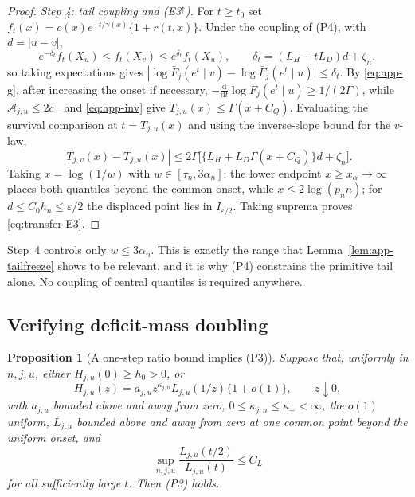 \documentclass[bj,authoryear]{imsart}
\theoremstyle{plain}
\newtheorem{proposition}[theorem]{Proposition}
\begin{document}
\begin{appendix}
\begin{proof}
\emph{Step 4: tail coupling and (E3$^\uparrow$).} For $t\ge t_0$ set
$f_t(x)=c(x)e^{-t/\gamma(x)}\{1+r(t,x)\}$. Under the coupling of (P4),
with $d=|u-v|$,
\[
 e^{-\delta_t}f_t(X_u)\le f_t(X_v)\le e^{\delta_t}f_t(X_u),
 \qquad
 \delta_t=(L_H+tL_D)d+\zeta_n,
\]
so taking expectations gives
$|\log\bar F_j(e^t\mid v)-\log\bar F_j(e^t\mid u)|\le\delta_t$. By
\eqref{eq:app-g}, after increasing the onset if necessary,
$-\frac{\mathrm d}{\mathrm dt}\log\bar F_j(e^t\mid u)\ge1/(2\Gamma)$,
while $\mathcal A_{j,u}\le2c_+$ and \eqref{eq:app-inv} give
$T_{j,u}(x)\le\Gamma(x+C_Q)$. Evaluating the survival comparison at
$t=T_{j,u}(x)$ and using the inverse-slope bound for the $v$-law,
\[
 |T_{j,v}(x)-T_{j,u}(x)|
 \le2\Gamma\bigl[\{L_H+L_D\Gamma(x+C_Q)\}d+\zeta_n\bigr].
\]
Taking $x=\log(1/w)$ with $w\in[\tau_n,3\alpha_n]$: the lower endpoint
$x\ge x_\alpha\to\infty$ places both quantiles beyond the common onset,
while $x\le2\log(p_nn)$; for $d\le C_0h_n\le\varepsilon/2$ the displaced
point lies in $I_{\varepsilon/2}$. Taking suprema proves
\eqref{eq:transfer-E3}.
\end{proof}

\begin{remark}
Step~4 controls only $w\le3\alpha_n$. This is exactly the range that
Lemma~\ref{lem:app-tailfreeze} shows to be relevant, and it is why (P4)
constrains the primitive tail alone. No coupling of central quantiles is
required anywhere.
\end{remark}

\subsection{Verifying deficit-mass doubling}

\begin{proposition}[A one-step ratio bound implies (P3)]
\label{prop:app-doubling}
Suppose that, uniformly in $n,j,u$, either $H_{j,u}(0)\ge h_0>0$, or
\begin{equation}\label{eq:app-margin}
 H_{j,u}(z)=a_{j,u}z^{\kappa_{j,n}}L_{j,u}(1/z)\{1+o(1)\},
 \qquad z\downarrow0,
\end{equation}
with $a_{j,u}$ bounded above and away from zero, $0\le\kappa_{j,n}\le
\kappa_+<\infty$, the $o(1)$ uniform, $L_{j,u}$ bounded above and away
from zero at one common point beyond the uniform onset, and
\begin{equation}\label{eq:app-onestep}
 \sup_{n,j,u}\frac{L_{j,u}(t/2)}{L_{j,u}(t)}\le C_L
\end{equation}
for all sufficiently large $t$. Then (P3) holds.
\end{proposition}


\end{appendix}
\end{document}
